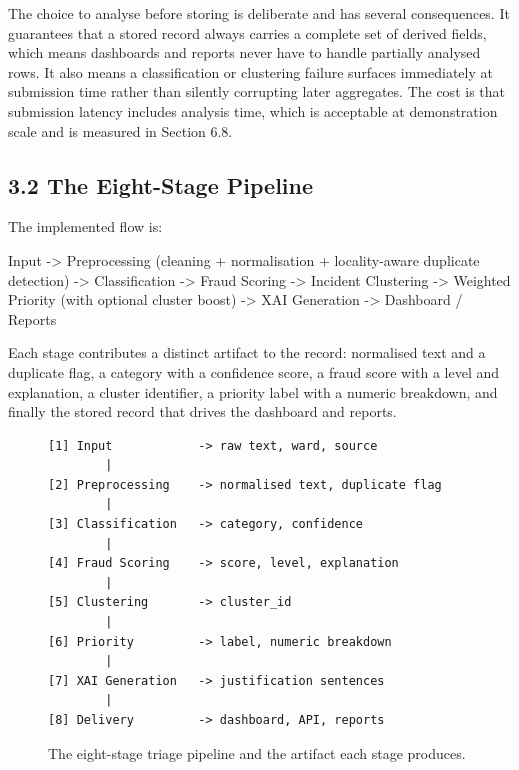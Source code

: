 \documentclass[10pt,letterpaper,oneside]{article}\usepackage{geometry}\geometry{top=1in,bottom=1in,left=1in,right=1in,includeheadfoot}\usepackage{xcolor}\definecolor{color@navy}{HTML}{1F3B63}\definecolor{color@grey}{HTML}{404040}\definecolor{color@hdr}{HTML}{F2F4F7}\usepackage{titlesec}\titleformat{\section}  {\normalfont\huge\bfseries\color@navy}  {}{0pt}{\MakeUppercase}\titleformat{\subsection}  {\normalfont\Large\bfseries\color@navy}  {}{0pt}{}\titleformat{\subsubsection}  {\normalfont\large\bfseries\color@navy}  {}{0pt}{}\titlespacing*{\section}{0pt}{14pt}{6pt}\titlespacing*{\subsection}{0pt}{10pt}{4pt}\titlespacing*{\subsubsection}{0pt}{8pt}{3pt}\setlength{\parindent}{0pt}\setlength{\parskip}{0.6em}\parindent=0pt\usepackage{enumitem}\setlist{nosep,leftmargin=*,itemsep=0pt,topsep=2pt,partopsep=0pt}\usepackage{array}\usepackage{booktabs}\usepackage{caption}\captionsetup{font={small,it},labelfont={bf},labelsep=period,  parskip=2pt,skip=4pt,list=no}\captionsetup[table]{labelfont={bf,small,color@navy},name=Table}\usepackage{graphicx}\usepackage{verbatim}\usepackage{ragged2e}\usepackage{longtable}\usepackage{tabularx}\usepackage{multirow}\usepackage{colortbl}\definecolor{rowshade}{HTML}{F2F4F7}\usepackage{tikz}\usetikzlibrary{positioning,calc}\usepackage[hidelinks]{hyperref}\hypersetup{colorlinks=true,linkcolor=color@navy,urlcolor=color@navy}\pagestyle{fancy}\fancyhf{}\renewcommand{\headrulewidth}{0.4pt}\fancyhead[L]{\small\color@navy CivicSense — Project Report}\fancyhead[R]{\small\color@grey October 11, 2026}\fancyfoot[C]{\small\color@grey An Integrated Intelligent Triage Pipelin}\fancyfoot[R]{\small\color@grey Page \thepage}\usepackage{setspace}\setstretch{1.15}\AtBeginDocument{  \hypersetup{pdftitle={An Integrated Intelligent Triage Pipeline for AI-Enhanced Citizen Complaint Management},    pdfauthor={CivicSense Project Team},    pdfsubject={Project Report},    pdfkeywords={smart cities, NLP, complaint management, e-governance},    pdfcreator={CivicSense Project Team}  }}
\begin{document}
The choice to analyse before storing is deliberate and has several consequences. It guarantees that a stored record always carries a complete set of derived fields, which means dashboards and reports never have to handle partially analysed rows. It also means a classification or clustering failure surfaces immediately at submission time rather than silently corrupting later aggregates. The cost is that submission latency includes analysis time, which is acceptable at demonstration scale and is measured in Section 6.8.

\subsection*{3.2 The Eight-Stage Pipeline}
The implemented flow is:

Input -> Preprocessing (cleaning + normalisation + locality-aware duplicate detection) -> Classification -> Fraud Scoring -> Incident Clustering -> Weighted Priority (with optional cluster boost) -> XAI Generation -> Dashboard / Reports

Each stage contributes a distinct artifact to the record: normalised text and a duplicate flag, a category with a confidence score, a fraud score with a level and explanation, a cluster identifier, a priority label with a numeric breakdown, and finally the stored record that drives the dashboard and reports.

\begin{figure}[htbp]
\centering
\begin{verbatim}
[1] Input            -> raw text, ward, source
        |
[2] Preprocessing    -> normalised text, duplicate flag
        |
[3] Classification   -> category, confidence
        |
[4] Fraud Scoring    -> score, level, explanation
        |
[5] Clustering       -> cluster_id
        |
[6] Priority         -> label, numeric breakdown
        |
[7] XAI Generation   -> justification sentences
        |
[8] Delivery         -> dashboard, API, reports
\end{verbatim}
\caption{The eight-stage triage pipeline and the artifact each stage produces.}
\end{figure}
\end{document}
